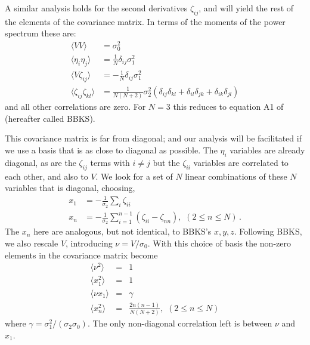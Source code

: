 \documentclass[12pt]{article}
\begin{document}
A similar analysis holds for the second derivatives $\zeta_{ij}$, and will yield the rest of the elements of the covariance matrix. In terms of the moments of the power spectrum these are:
%
\begin{equation} \label{corr}
\begin{split}
\langle VV \rangle &= \sigma_0^2 \\
\langle\eta_i\eta_j\rangle &= \frac{1}{N}\delta_{ij}\sigma_1^2 \\
\langle V\zeta_{ij}\rangle &= -\frac{1}{N}\delta_{ij}\sigma_1^2 \\
\langle\zeta_{ij}\zeta_{kl}\rangle &= \frac{1}{N(N+2)}\sigma_2^2(\delta_{ij}\delta_{kl}+\delta_{il}\delta_{jk}+\delta_{ik}\delta_{jl})
\end{split}
\end{equation}
%
and all other correlations are zero. For $N=3$ this reduces to equation A1 of \cite{BBKS} (hereafter called BBKS). 

This covariance matrix is far from diagonal; and our analysis will be facilitated if we use a basis that is as close to diagonal as possible. The $\eta_i$ variables are already diagonal, as are the $\zeta_{ij}$ terms with $i\neq j$ but the $\zeta_{ii}$ variables are correlated to each other, and also  to $V$. We look for a set of $N$ linear combinations of these $N$ variables that is diagonal, choosing,
\begin{align}
\label{BasisTransform}
x_1 &= -\frac{1}{\sigma_2}\sum_i\zeta_{ii} \nonumber \\
x_n &= -\frac{1}{\sigma_2}\sum_{i=1}^{n-1}\left(\zeta_{ii}-\zeta_{nn}\right),\,\, (2\leq n \leq N) \, .
\end{align}
%
The $x_n$ here are analogous, but not identical, to BBKS's $x, y, z$. Following BBKS, we also rescale $V$, introducing $\nu = V/\sigma_0$. With this choice of basis the non-zero elements in the covariance matrix become
%
\begin{eqnarray}
  \langle\nu^2\rangle &=& 1 \nonumber\\
  \langle x_1^2\rangle&=&1 \\
  \langle\nu x_1\rangle &=& \gamma \nonumber\\
  \langle x_n^2 \rangle &=& \frac{2n(n-1)}{N(N+2)},\,\, (2\leq n \leq N) \nonumber
\end{eqnarray}
%
\noindent where $\gamma = \sigma_1^2/(\sigma_2 \sigma_0)$. The only non-diagonal correlation left is between $\nu$ and $x_1$.
\end{document}
